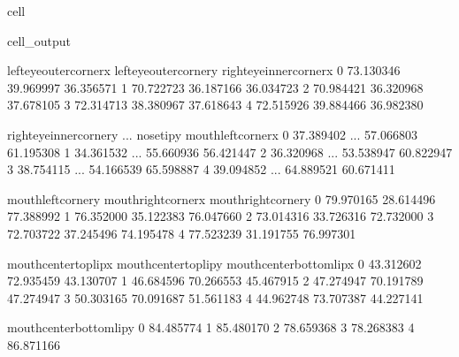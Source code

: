 \documentclass[letterpaper,10pt,english]{jupyterBook}
\begin{document}
\begin{sphinxuseclass}{cell}
\begin{sphinxVerbatimOutput}
\begin{sphinxuseclass}{cell_output}
\begin{sphinxVerbatim}[commandchars=\\\{\}]
   left\PYGZus{}eye\PYGZus{}outer\PYGZus{}corner\PYGZus{}x  left\PYGZus{}eye\PYGZus{}outer\PYGZus{}corner\PYGZus{}y  right\PYGZus{}eye\PYGZus{}inner\PYGZus{}corner\PYGZus{}x  \PYGZbs{}
0                73.130346                39.969997                 36.356571   
1                70.722723                36.187166                 36.034723   
2                70.984421                36.320968                 37.678105   
3                72.314713                38.380967                 37.618643   
4                72.515926                39.884466                 36.982380   

   right\PYGZus{}eye\PYGZus{}inner\PYGZus{}corner\PYGZus{}y  ...  nose\PYGZus{}tip\PYGZus{}y  mouth\PYGZus{}left\PYGZus{}corner\PYGZus{}x  \PYGZbs{}
0                 37.389402  ...   57.066803            61.195308   
1                 34.361532  ...   55.660936            56.421447   
2                 36.320968  ...   53.538947            60.822947   
3                 38.754115  ...   54.166539            65.598887   
4                 39.094852  ...   64.889521            60.671411   

   mouth\PYGZus{}left\PYGZus{}corner\PYGZus{}y  mouth\PYGZus{}right\PYGZus{}corner\PYGZus{}x  mouth\PYGZus{}right\PYGZus{}corner\PYGZus{}y  \PYGZbs{}
0            79.970165             28.614496             77.388992   
1            76.352000             35.122383             76.047660   
2            73.014316             33.726316             72.732000   
3            72.703722             37.245496             74.195478   
4            77.523239             31.191755             76.997301   

   mouth\PYGZus{}center\PYGZus{}top\PYGZus{}lip\PYGZus{}x  mouth\PYGZus{}center\PYGZus{}top\PYGZus{}lip\PYGZus{}y  mouth\PYGZus{}center\PYGZus{}bottom\PYGZus{}lip\PYGZus{}x  \PYGZbs{}
0               43.312602               72.935459                  43.130707   
1               46.684596               70.266553                  45.467915   
2               47.274947               70.191789                  47.274947   
3               50.303165               70.091687                  51.561183   
4               44.962748               73.707387                  44.227141   

   mouth\PYGZus{}center\PYGZus{}bottom\PYGZus{}lip\PYGZus{}y  \PYGZbs{}
0                  84.485774   
1                  85.480170   
2                  78.659368   
3                  78.268383   
4                  86.871166   


\end{sphinxVerbatim}
\end{sphinxuseclass}
\end{sphinxVerbatimOutput}
\end{sphinxuseclass}
\end{document}
